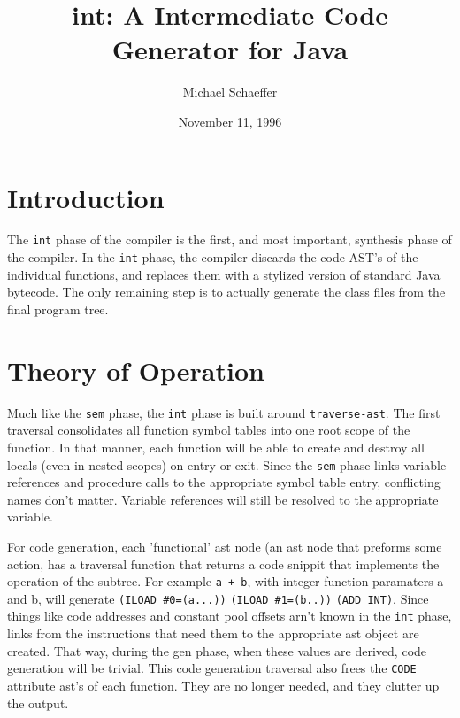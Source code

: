 \documentclass{article}[1994/05/24]
\title{int: A Intermediate Code Generator for Java}
\author{Michael Schaeffer}
\date{November 11, 1996}
\begin{document}
\maketitle


\section{Introduction}

	The \verb|int| phase of the compiler is the first, and most
important, synthesis phase of the compiler.  In the \verb|int|
phase, the compiler discards the code AST's of the
individual functions, and replaces them with a stylized
version of standard Java bytecode. The only remaining step
is to actually generate the class files from the final
program tree.

\section{Theory of Operation}

	Much like the \verb|sem| phase, the \verb|int| phase is built
around \verb|traverse-ast|.  The first traversal consolidates all 
function symbol tables into one root scope of the function.  In
that manner, each function will be able to create and destroy all
locals (even in nested scopes) on entry or exit. Since the
\verb|sem| phase links variable references and procedure calls to
the appropriate symbol table entry, conflicting names don't matter.
Variable references will still be resolved to the appropriate
variable.

	For code generation, each 'functional' ast node (an ast node
that  preforms some action, has a traversal function that returns a
code snippit that implements the operation of the subtree.  For 
example \verb|a + b|, with integer function paramaters a and b, 
will generate \verb|(ILOAD #0=(a...))| \verb|(ILOAD #1=(b..))| 
\verb|(ADD INT)|. Since things like code addresses and constant
pool offsets arn't known in the \verb|int| phase, links from the
instructions that need them to the appropriate ast object are
created.  That way, during the gen phase, when these values are
derived, code generation will be trivial. This code generation
traversal also frees the \verb|CODE| attribute ast's of each function.
They are no longer needed, and they clutter up the output.
\end{document}

